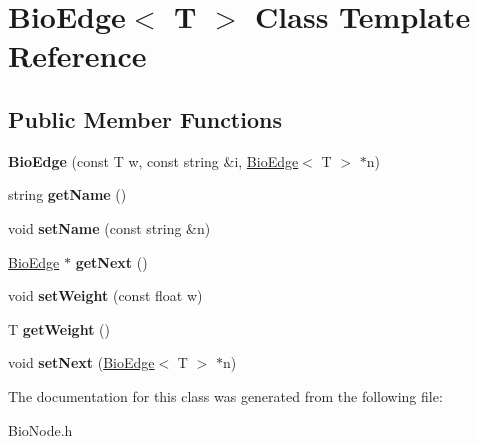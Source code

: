 \hypertarget{class_bio_edge}{}\section{Bio\+Edge$<$ T $>$ Class Template Reference}
\label{class_bio_edge}
\subsection*{Public Member Functions}
\begin{DoxyCompactItemize}
\item 
\mbox{\label{class_bio_edge_a4086d783935d7f70febe1d3aebe14409}} 
{\bfseries Bio\+Edge} (const T w, const string \&i, \hyperlink{class_bio_edge}{Bio\+Edge}$<$ T $>$ $\ast$n)
\item 
\mbox{\label{class_bio_edge_ab7ec2b663698b813260003fc7cde81c2}} 
string {\bfseries get\+Name} ()
\item 
\mbox{\label{class_bio_edge_a6c97a0845e721c68e2a64416eef4fa2e}} 
void {\bfseries set\+Name} (const string \&n)
\item 
\mbox{\label{class_bio_edge_a114cdc0f74e9a5de8f450ba59eeebbc3}} 
\hyperlink{class_bio_edge}{Bio\+Edge} $\ast$ {\bfseries get\+Next} ()
\item 
\mbox{\label{class_bio_edge_ab7b6c881044bd82c5a2d370102e0786d}} 
void {\bfseries set\+Weight} (const float w)
\item 
\mbox{\label{class_bio_edge_a15c1359f12ddf7c06b9585ff13313c3b}} 
T {\bfseries get\+Weight} ()
\item 
\mbox{\label{class_bio_edge_a550b29b03993989a619b2e4bf79806e3}} 
void {\bfseries set\+Next} (\hyperlink{class_bio_edge}{Bio\+Edge}$<$ T $>$ $\ast$n)
\end{DoxyCompactItemize}


The documentation for this class was generated from the following file\+:\begin{DoxyCompactItemize}
\item 
Bio\+Node.\+h\end{DoxyCompactItemize}
